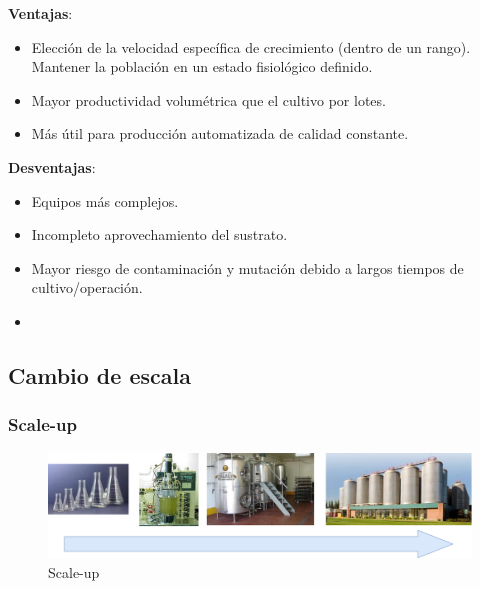         \begin{multicols}{2}
            \textbf{Ventajas}:
            \begin{itemize}
                \item Elección de la velocidad específica de crecimiento (dentro de un rango). Mantener la población en un estado fisiológico definido.
                \item Mayor productividad volumétrica que el cultivo por lotes.
                \item Más útil para producción automatizada de calidad constante.
            \end{itemize}
            
            \textbf{Desventajas}:
            \begin{itemize}
                \item Equipos más complejos.
                \item Incompleto aprovechamiento del sustrato.
                \item Mayor riesgo de contaminación y mutación debido a largos tiempos de cultivo/operación.
                \item []
            \end{itemize}
        \end{multicols}
    
    \subsection{Cambio de escala}
    
        \subsubsection{Scale-up}
        
        \begin{figure}
            \centering
            \includegraphics[width=\textwidth]{img/fotos/scale_up.png}
            \caption{Scale-up}
            \label{fig:scale_up}
        \end{figure}
        
        \begin{quote}
            \textit{}
        \end{quote}
        
